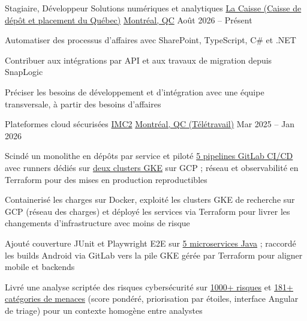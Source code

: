 
\begin{cventries}

\cventry
{Stagiaire, Développeur Solutions numériques et analytiques} %
{\href{https://www.lacaisse.com/}{La Caisse (Caisse de dépôt et placement du Québec)}} %
{\href{https://www.google.com/maps/search/?api=1\&query=Montreal,+QC,+Canada}{Montréal, QC}} %
{Août 2026 -- Présent} %
{\begin{cvitems}
\item {Automatiser des processus d’affaires avec SharePoint, TypeScript, C\# et .NET}
\item {Contribuer aux intégrations par API et aux travaux de migration depuis SnapLogic}
\item {Préciser les besoins de développement et d’intégration avec une équipe transversale, à partir des besoins d’affaires}
\end{cvitems}}

\cventry
{Plateformes cloud sécurisées} %
{\href{https://i-mc2.ca/fr/}{IMC2}} %
{\href{https://www.google.com/maps/search/?api=1\&query=Montreal,+QC,+Canada}{Montréal, QC (Télétravail)}} %
{Mar 2025 -- Jan 2026} %
{
\begin{cvitems}
\item {Scindé un monolithe en dépôts par service et piloté \uline{5 pipelines GitLab CI/CD} avec runners dédiés sur \uline{deux clusters GKE} sur GCP ; réseau et \mbox{observabilité} en Terraform pour des mises en production reproductibles}
\item {Containerisé les charges sur Docker, exploité les clusters GKE de recherche sur GCP (réseau des charges) et déployé les services via Terraform pour livrer les changements d'infrastructure avec moins de risque}
\item {Ajouté couverture JUnit et Playwright E2E sur \uline{5 microservices Java} ; raccordé les builds Android via GitLab vers la pile GKE gérée par Terraform pour aligner mobile et backends}
\item {Livré une analyse scriptée des risques cybersécurité sur \uline{1000+ risques} et \uline{181+ catégories de menaces} (score pondéré, priorisation par étoiles, interface Angular de triage) pour un contexte homogène entre analystes}
\end{cvitems}
}


\end{cventries}

